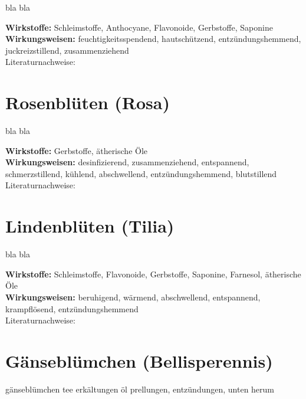 bla bla

\textbf{Wirkstoffe:} Schleimstoffe, Anthocyane, Flavonoide, Gerbstoffe, Saponine\\

\textbf{Wirkungsweisen:} feuchtigkeitsspendend, hautschützend, entzündungshemmend, juckreizstillend, zusammenziehend \\

Literaturnachweise: \cite{nedoma2018heilsalben}


\section{Rosenblüten (Rosa)}
\label{   }

bla bla

\textbf{Wirkstoffe:} Gerbstoffe, ätherische Öle\\

\textbf{Wirkungsweisen:} desinfizierend, zusammenziehend, entspannend, schmerzstillend, kühlend, abschwellend, entzündungshemmend, blutstillend \\

Literaturnachweise: \cite{nedoma2018heilsalben}


\section{Lindenblüten (Tilia)}
\label{   }

bla bla

\textbf{Wirkstoffe:} Schleimstoffe, Flavonoide, Gerbstoffe, Saponine, Farnesol, ätherische Öle \\

\textbf{Wirkungsweisen:} beruhigend, wärmend, abschwellend, entspannend, krampflösend, entzündungshemmend \\

Literaturnachweise: \cite{nedoma2018heilsalben}


\section{Gänseblümchen (Bellisperennis)}
\label{   }


gänseblümchen	
tee erkältungen
öl prellungen, entzündungen, unten herum



